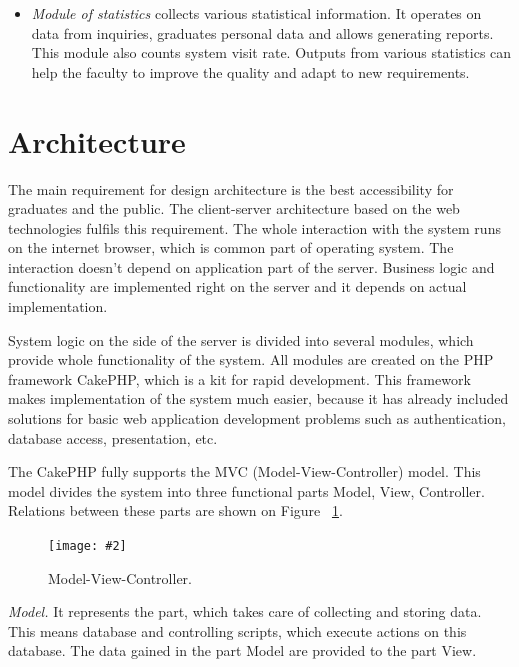 \documentclass{iitsrc}[2006/14/02]
\newcommand\fig[4]{%
	\begin{figure}[h]
	\begin{center}
	\texttt{[image: \#2]}
	~\\%
	\caption{#4}
	\label{#3}
	\end{center}
	\end{figure}
}
\begin{document}
\begin{itemize}
\item {\em Module of statistics}
collects various statistical information. It operates on data from inquiries, graduates personal data and allows generating reports. This module also counts system visit rate. Outputs from various statistics can help the faculty to improve the quality and adapt to new requirements.

\end{itemize}

\section{Architecture}

The main requirement for design architecture is the best accessibility for graduates and the public. The client-server architecture based on the web technologies fulfils this requirement. The whole interaction with the system runs on the internet browser, which is common part of operating system. The interaction doesn't depend on application part of the server. Business logic and functionality are implemented right on the server and it depends on actual implementation.

System logic on the side of the server is divided into several modules, which provide whole functionality of the system. All modules are created on the PHP framework CakePHP, which is a kit for rapid development. This framework makes implementation of the system much easier, because it has already included solutions for basic web application development problems such as authentication, database access, presentation, etc.

The CakePHP fully supports the MVC (Model-View-Controller) model\cite{cakephp}. This model divides the system into three functional parts Model, View, Controller. Relations between these parts are shown on Figure ~\ref{fig:mvc}.


\fig{width=8cm}{images/mvc}{fig:mvc}{Model-View-Controller.}

{\em Model.} It represents the part, which takes care of collecting and storing data. This means database and controlling scripts, which execute actions on this database. The data gained in the part Model are provided to the part View.
\end{document}
